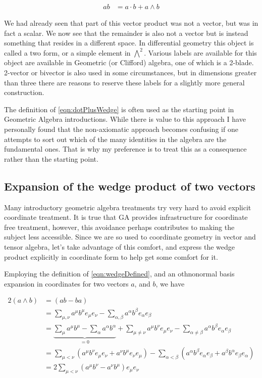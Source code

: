 \documentclass{article}
\begin{document}
\begin{align}\label{eqn:dotPlusWedge}
a b %
&= a \cdot b + a \wedge b
\end{align}

We had already seen that part of this vector product was not a vector, but was in fact a scalar.  We now see that the remainder is also not a vector but is instead something that resides in a different space.  In differential geometry this object is called a two form, or a simple element in $\bigwedge^2$.  Various labels are available for this object are available in Geometric (or Clifford) algebra, one of which is a 2-blade.  2-vector or bivector is also used in some circumstances, but in dimensions greater than three there are reasons to reserve these labels for a slightly more general construction.

The definition of \ref{eqn:dotPlusWedge} is often used as the starting point in Geometric Algebra introductions.  While there is value to this approach I have personally found that the non-axiomatic approach becomes confusing if one attempts to sort out which of the many identities in the algebra are the fundamental ones.  That is why my preference is to treat this as a consequence rather than the starting point.

\subsection{ Expansion of the wedge product of two vectors }

Many introductory geometric algebra treatments try very hard to avoid explicit coordinate treatment.  It is true that GA provides infrastructure for coordinate free treatment, however, this avoidance perhaps contributes to making the subject less accessible.  Since we are so used to coordinate geometry in vector and tensor algebra, let's take advantage of this comfort, and express the wedge product explicitly in coordinate form to help get some comfort for it.

Employing the definition of \ref{eqn:wedgeDefined}, and an othnonormal basis
expansion in 
coordinates for two vectors $a$, and $b$, we have

\begin{align*}
2 (a \wedge b)
&= ( a b - b a ) \\
&= 
\sum_{\mu,\nu} a^\mu b^\mu e_\mu e_\nu 
-\sum_{\alpha,\beta} a^\alpha b^\beta e_\alpha e_\beta \\
&= 
\underbrace{\sum_{\mu} a^\mu b^\mu 
- \sum_{\alpha} a^\alpha b^\alpha }_{=0}
+ \sum_{\mu \ne \nu} a^\mu b^\nu e_\mu e_\nu 
- \sum_{\alpha \ne \beta} a^\alpha b^\beta e_\alpha e_\beta \\
&=
\sum_{\mu < \nu} (a^\mu b^\nu e_\mu e_\nu + a^\nu b^\mu e_\nu e_\mu)
- \sum_{\alpha < \beta} (a^\alpha b^\beta e_\alpha e_\beta + a^\beta b^\alpha e_\beta e_\alpha )
\\
&=
2 \sum_{\mu < \nu} ( a^\mu b^\nu - a^\nu b^\mu ) e_\mu e_\nu 
\end{align*}
\end{document}
